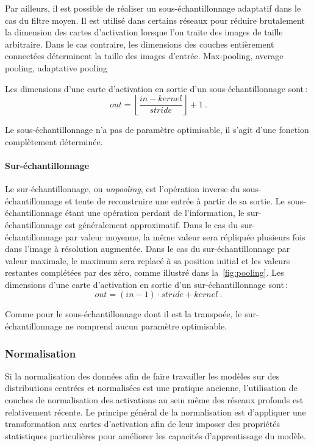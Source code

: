 Par ailleurs, il est possible de réaliser un sous-échantillonnage adaptatif dans le cas du filtre moyen. Il est utilisé dans certains réseaux pour réduire brutalement la dimension des cartes d'activation lorsque l'on traite des images de taille arbitraire. Dans le cas contraire, les dimensions des couches entièrement connectées déterminent la taille des images d'entrée.
Max-pooling, average pooling, adaptative pooling

Les dimensions d'une carte d'activation en sortie d'un sous-échantillonnage sont\,:
$$out = \left\lfloor \frac{in - kernel}{stride}\right\rfloor + 1~.$$

Le sous-échantillonnage n'a pas de paramètre optimisable, il s'agit d'une fonction complètement déterminée.

\paragraph{Sur-échantillonnage}

Le sur-échantillonnage, ou \emph{unpooling}, est l'opération inverse du sous-échantillonnage et tente de reconstruire une entrée à partir de sa sortie. Le sous-échantillonnage étant une opération perdant de l'information, le sur-échantillonnage est généralement approximatif. Dans le cas du sur-échantillonnage par valeur moyenne, la même valeur sera répliquée plusieurs fois dans l'image à résolution augmentée. Dans le cas du sur-échantillonnage par valeur maximale, le maximum sera replacé à sa position initial et les valeurs restantes complétées par des zéro, comme illustré dans la~\cref{fig:pooling}.
Les dimensions d'une carte d'activation en sortie d'un sur-échantillonnage sont\,:
$$out = (in - 1) \cdot stride + kernel~.$$

Comme pour le sous-échantillonnage dont il est la transpoée, le sur-échantillonnage ne comprend aucun paramètre optimisable.

\subsubsection{Normalisation}

Si la normalisation des données afin de faire travailler les modèles sur des distributions centrées et normalisées est une pratique ancienne, l'utilisation de couches de normalisation des activations au sein même des réseaux profonds est relativement récente. Le principe général de la normalisation est d'appliquer une transformation aux cartes d'activation afin de leur imposer des propriétés statistiques particulières pour améliorer les capacités d'apprentissage du modèle.

